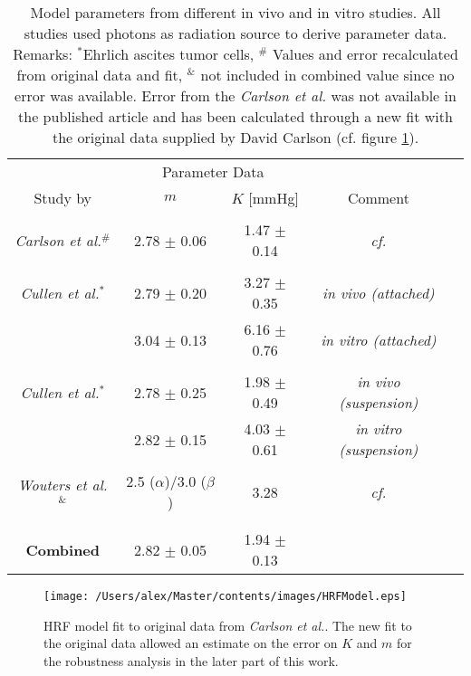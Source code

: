 \begin{table}[tb]
\small
\centering
\begin{tabular}{ccccc}
\toprule
\multicolumn{1}{c}{} & \multicolumn{2}{c}{Parameter Data} \\
\cmidrule(r){2-3}
Study by &  $m$ & $K$ [mmHg] & Comment\\
\midrule\\
\textit{Carlson et al.}\cite{pmid21183291}$^\#$ & 2.78 $\pm$ 0.06 & 1.47 $\pm$ 0.14 & \textit{cf.} \cite{pmid7410133}\cite{pmid6718689}\cite{pmid412319}\cite{pmid17022202}\\\\
\textit{Cullen et al.}\cite{pmid4616914}$^*$	 & 2.79 $\pm$ 0.20 & 3.27 $\pm$ 0.35 & \textit{in vivo (attached)}\\
									 & 3.04 $\pm$ 0.13 & 6.16 $\pm$ 0.76 & \textit{in vitro (attached)}\\\\
\textit{Cullen et al.}\cite{pmid1084867}$^*$	 & 2.78 $\pm$ 0.25 & 1.98 $\pm$ 0.49 & \textit{in vivo (suspension)}\\
									 & 2.82 $\pm$ 0.15 & 4.03 $\pm$ 0.61 & \textit{in vitro (suspension)}\\\\
\textit{Wouters et al.}\cite{pmid9146699}$^\&$  & 2.5 ($\alpha$)/3.0 ($\beta$) & 3.28 & \textit{cf.} \cite{pmid412319}\cite{pmid6718689}\\\\
\bottomrule\\
\textbf{Combined} & 2.82 $\pm$ 0.05 & 1.94 $\pm$ 0.13 & 
\end{tabular}
\caption{Model parameters from different in vivo and in vitro studies. All studies used photons as radiation source to derive parameter data. Remarks: $^*$Ehrlich ascites tumor cells, $^\#$ Values and error recalculated from original data and fit, $^\&$ not included in combined value since no error was available. Error from the \textit{Carlson et al.} was not available in the published article and has been calculated through a new fit with the original data supplied by David Carlson (cf. figure \ref{fig:HRFModel}).}
\label{tab:modelparameter}
\end{table}
\begin{figure}[htb]
\centering
\texttt{[image: /Users/alex/Master/contents/images/HRFModel.eps]}
\caption{HRF model fit to original data from \textit{Carlson et al.}\cite{pmid21183291}. The new fit to the original data allowed an estimate on the error on $K$ and $m$ for the robustness analysis in the later part of this work.}
\label{fig:HRFModel}
\end{figure}
